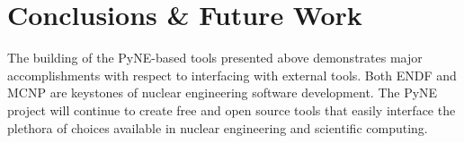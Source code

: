 \documentclass{ansconf}
\begin{document}
\section{Conclusions \& Future Work}
\label{sec:conc}

The building of the PyNE-based tools presented above demonstrates major 
accomplishments with respect
to interfacing with external tools.  Both ENDF and MCNP are keystones of 
nuclear engineering software development.  The PyNE project will continue to create 
free and open source tools that easily interface the plethora of choices available 
in nuclear engineering and scientific computing. 



\end{document}
